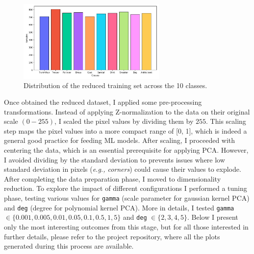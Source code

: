\begin{figure}[ht]
    \centering
    \includegraphics[width=0.65\textwidth]{../plots/reduced_dataset_representativeness.png}
    \caption{\footnotesize Distribution of the reduced training set across the 10 classes.}
    \label{fig:dataset_representativeness}
\end{figure}
\newpage
Once obtained the reduced dataset, I applied some pre-processing transformations. Instead of applying Z-normalization to the data 
on their original scale $(0-255)$, I scaled the pixel values by dividing them by $255$. This scaling step maps the pixel 
values into a more compact range of [0, 1], which is indeed a general good practice for feeding ML models. After scaling, I 
proceeded with centering the data, which is an essential prerequisite for applying PCA. However, I avoided dividing by the standard 
deviation to prevents issues where low standard deviation in pixels (\emph{e.g., corners}) could cause their values to explode.\\[0.2cm]
After completing the data preparation phase, I moved to dimensionality reduction. To explore the impact of different 
configurations I performed a tuning phase, testing various values for \texttt{gamma} (scale parameter for gaussian kernel PCA)
and \texttt{deg} (degree for polynomial kernel PCA). More in details, I tested \texttt{gamma} $\in \{0.001,0.005,0.01,0.05,0.1,0.5,1,5\}$ and
\texttt{deg} $\in \{2,3,4,5\}$. Below I present only the most interesting outcomes from this stage, but for all those 
interested in further details, please refer to the project repository, where all the plots generated during this process are available.

